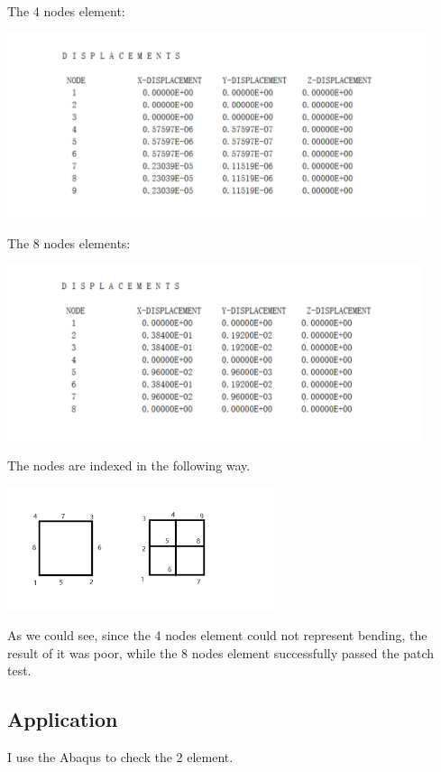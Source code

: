 \documentclass[UTF8]{ctexbook}
\begin{document}
     The 4 nodes element:
        \begin{center}
            \includegraphics[width=12.30cm,height=5.41cm]{plate4Q.pdf}
        \end{center}
    
    The 8 nodes elements:
        \begin{center}
            \includegraphics[width=12.15cm,height=5.13cm]{plate8Q.pdf}
        \end{center}
    The nodes are indexed in the following way.
        \begin{center}
            \includegraphics[width=7.84cm,height=3.60cm]{index.pdf}
       \end{center}
    As we could see, since the 4 nodes element could not represent bending, the result of it was poor, while the 8 nodes element successfully passed the patch test. 
    \subsection{Application}
    I use the Abaqus to check the 2 element.
    
\end{document}
